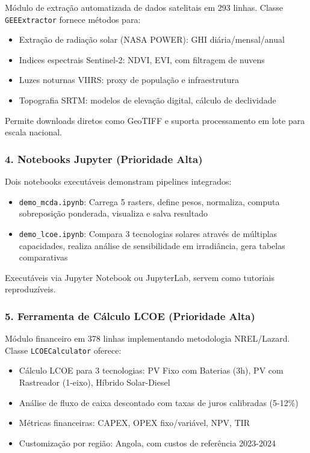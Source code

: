 \documentclass[12pt, a4paper]{article}
\begin{document}
Módulo de extração automatizada de dados satelitais em 293 linhas. Classe \texttt{GEEExtractor} fornece métodos para:

\begin{itemize}
    \item Extração de radiação solar (NASA POWER): GHI diária/mensal/anual
    \item Indices espectrais Sentinel-2: NDVI, EVI, com filtragem de nuvens
    \item Luzes noturnas VIIRS: proxy de população e infraestrutura
    \item Topografia SRTM: modelos de elevação digital, cálculo de declividade
\end{itemize}

Permite downloads diretos como GeoTIFF e suporta processamento em lote para escala nacional.

\subsubsection{4. Notebooks Jupyter (Prioridade Alta)}

Dois notebooks executáveis demonstram pipelines integrados:

\begin{itemize}
    \item \texttt{demo\_mcda.ipynb}: Carrega 5 rasters, define pesos, normaliza, computa sobreposição ponderada, visualiza e salva resultado
    \item \texttt{demo\_lcoe.ipynb}: Compara 3 tecnologias solares através de múltiplas capacidades, realiza análise de sensibilidade em irradiância, gera tabelas comparativas
\end{itemize}

Executáveis via Jupyter Notebook ou JupyterLab, servem como tutoriais reproduzíveis.

\subsubsection{5. Ferramenta de Cálculo LCOE (Prioridade Alta)}

Módulo financeiro em 378 linhas implementando metodologia NREL/Lazard. Classe \texttt{LCOECalculator} oferece:

\begin{itemize}
    \item Cálculo LCOE para 3 tecnologias: PV Fixo com Baterias (3h), PV com Rastreador (1-eixo), Híbrido Solar-Diesel
    \item Análise de fluxo de caixa descontado com taxas de juros calibradas (5-12\%)
    \item Métricas financeiras: CAPEX, OPEX fixo/variável, NPV, TIR
    \item Customização por região: Angola, com custos de referência 2023-2024
\end{itemize}
\end{document}
